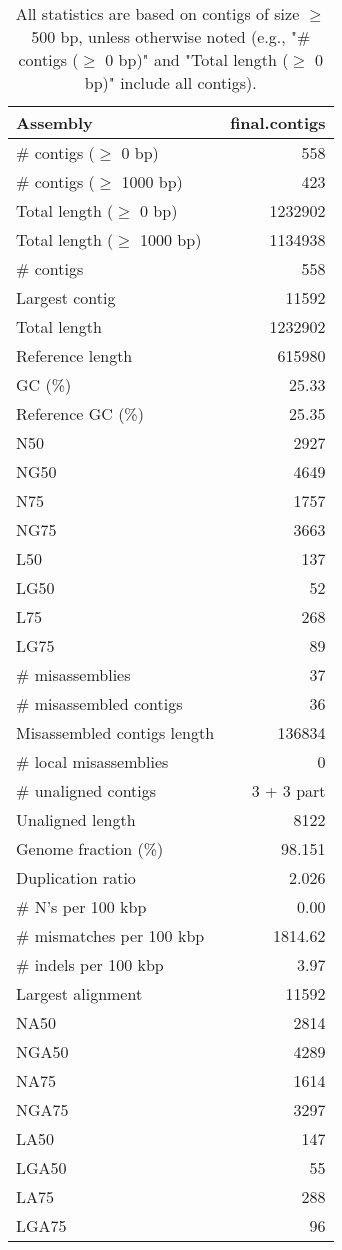 \documentclass[12pt,a4paper]{article}
\begin{document}
\begin{table}[ht]
\begin{center}
\caption{All statistics are based on contigs of size $\geq$ 500 bp, unless otherwise noted (e.g., "\# contigs ($\geq$ 0 bp)" and "Total length ($\geq$ 0 bp)" include all contigs).}
\begin{tabular}{|l*{1}{|r}|}
\hline
Assembly & final.contigs \\ \hline
\# contigs ($\geq$ 0 bp) & 558 \\ \hline
\# contigs ($\geq$ 1000 bp) & 423 \\ \hline
Total length ($\geq$ 0 bp) & 1232902 \\ \hline
Total length ($\geq$ 1000 bp) & 1134938 \\ \hline
\# contigs & 558 \\ \hline
Largest contig & 11592 \\ \hline
Total length & 1232902 \\ \hline
Reference length & 615980 \\ \hline
GC (\%) & 25.33 \\ \hline
Reference GC (\%) & 25.35 \\ \hline
N50 & 2927 \\ \hline
NG50 & 4649 \\ \hline
N75 & 1757 \\ \hline
NG75 & 3663 \\ \hline
L50 & 137 \\ \hline
LG50 & 52 \\ \hline
L75 & 268 \\ \hline
LG75 & 89 \\ \hline
\# misassemblies & 37 \\ \hline
\# misassembled contigs & 36 \\ \hline
Misassembled contigs length & 136834 \\ \hline
\# local misassemblies & 0 \\ \hline
\# unaligned contigs & 3 + 3 part \\ \hline
Unaligned length & 8122 \\ \hline
Genome fraction (\%) & 98.151 \\ \hline
Duplication ratio & 2.026 \\ \hline
\# N's per 100 kbp & 0.00 \\ \hline
\# mismatches per 100 kbp & 1814.62 \\ \hline
\# indels per 100 kbp & 3.97 \\ \hline
Largest alignment & 11592 \\ \hline
NA50 & 2814 \\ \hline
NGA50 & 4289 \\ \hline
NA75 & 1614 \\ \hline
NGA75 & 3297 \\ \hline
LA50 & 147 \\ \hline
LGA50 & 55 \\ \hline
LA75 & 288 \\ \hline
LGA75 & 96 \\ \hline
\end{tabular}
\end{center}
\end{table}
\end{document}
